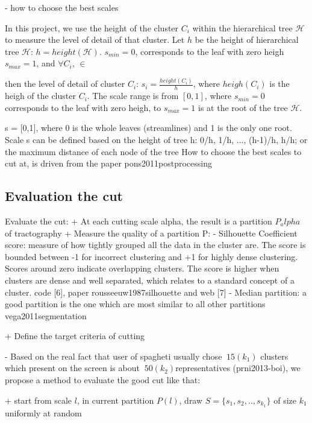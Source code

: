 - how to choose the best scales 

In this project, we use the height of the cluster $C_i$ within the hierarchical tree $\mathcal{H}$ to measure the level of detail of that cluster. Let $h$ be the height of hierarchical tree $\mathcal{H}$: $h = height(\mathcal{H})$. $s_{min} = 0$, corresponds to the leaf with zero heigh $s_{max} = 1$, and $\forall C_i $, $\in $

 then the level of detail of cluster $C_i$: $s_i = \frac{height(C_i)}{h}$, where $heigh(C_i)$ is the heigh of the cluster $C_i$. The scale range is from $[0,1]$, where $s_{min} = 0$ corresponds to the leaf with zero heigh, to $s_{max} = 1$ is at the root of the tree $\mathcal{H}$.

s = [0,1], where 0 is the whole leaves (streamlines) and 1 is the only one root. Scale s can be defined based on the height of tree h: 0/h, 1/h, ..., (h-1)/h, h/h; or the maximum distance of each node of the tree \cite{yang2003interactive}
How to choose the best scales to cut at, is driven from the paper pons2011postprocessing

\subsection{Evaluation the cut}
\label{sec:evaluation_cut}
Evaluate the cut:
+ At each cutting scale alpha, the result is a partition $P_alpha$ of tractography
+ Measure the quality of a partition P:
- Silhouette Coefficient score: measure of how tightly grouped all the data in the cluster are. The score is bounded between -1 for incorrect clustering and +1 for highly dense clustering. Scores around zero indicate overlapping clusters. The score is higher when clusters are dense and well separated, which relates to a standard concept of a cluster. code [6], paper rousseeuw1987silhouette and web [7]
- Median partition: a good partition is the one which are most similar to all other partitions vega2011segmentation

+ Define the target criteria of cutting

- Based on the real fact that user of spagheti usually chose $~15 (k_1)$ clusters which present on the screen is about $~50 (k_2)$representatives (prni2013-boi), we propose a method to evaluate the good cut like that:

+ start from scale $l$, in current partition $P(l)$, draw $S=\{s_1,s_2,..,s_{k_1}\}$ of size $k_1$ uniformly at random

